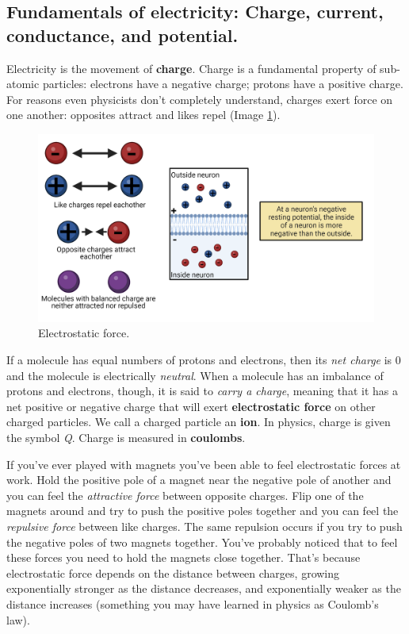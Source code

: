 \documentclass[
]{book}
\begin{document}
\hypertarget{fundamentals-of-electricity-charge-current-conductance-and-potential.}{%
\subsection{Fundamentals of electricity: Charge, current, conductance, and potential.}\label{fundamentals-of-electricity-charge-current-conductance-and-potential.}}

Electricity is the movement of \textbf{charge}. Charge is a fundamental property of sub-atomic particles: electrons have a negative charge; protons have a positive charge. For reasons even physicists don't completely understand, charges exert force on one another: opposites attract and likes repel (Image \ref{fig:ch02-electrostatic-force}).

\begin{figure}

{\centering \includegraphics[width=0.9\linewidth]{images/ch02/02_11} 

}

\caption{Electrostatic force.}\label{fig:ch02-electrostatic-force}
\end{figure}

If a molecule has equal numbers of protons and electrons, then its \emph{net charge} is 0 and the molecule is electrically \emph{neutral}. When a molecule has an imbalance of protons and electrons, though, it is said to \emph{carry a charge}, meaning that it has a net positive or negative charge that will exert \textbf{electrostatic force} on other charged particles. We call a charged particle an \textbf{ion}. In physics, charge is given the symbol \emph{Q}. Charge is measured in \textbf{coulombs}.

If you've ever played with magnets you've been able to feel electrostatic forces at work. Hold the positive pole of a magnet near the negative pole of another and you can feel the \emph{attractive force} between opposite charges. Flip one of the magnets around and try to push the positive poles together and you can feel the \emph{repulsive force} between like charges. The same repulsion occurs if you try to push the negative poles of two magnets together. You've probably noticed that to feel these forces you need to hold the magnets close together. That's because electrostatic force depends on the distance between charges, growing exponentially stronger as the distance decreases, and exponentially weaker as the distance increases (something you may have learned in physics as Coulomb's law).
\end{document}
